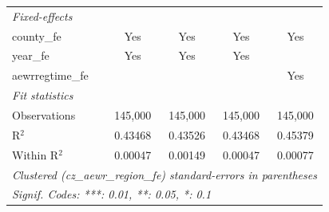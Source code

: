 \begin{tabular}{lcccc}
   \midrule
   \emph{Fixed-effects}\\
   county\_fe                                        & Yes            & Yes                   & Yes               & Yes\\  
   year\_fe                                          & Yes            & Yes                   & Yes               & \\  
   aewrregtime\_fe                                   &                &                       &                   & Yes\\  
   \midrule
   \emph{Fit statistics}\\
   Observations                                      & 145,000        & 145,000               & 145,000           & 145,000\\  
   R$^2$                                             & 0.43468        & 0.43526               & 0.43468           & 0.45379\\  
   Within R$^2$                                      & 0.00047        & 0.00149               & 0.00047           & 0.00077\\  
   \midrule \midrule
   \multicolumn{5}{l}{\emph{Clustered (cz\_aewr\_region\_fe) standard-errors in parentheses}}\\
   \multicolumn{5}{l}{\emph{Signif. Codes: ***: 0.01, **: 0.05, *: 0.1}}\\
\end{tabular}
\par\endgroup


